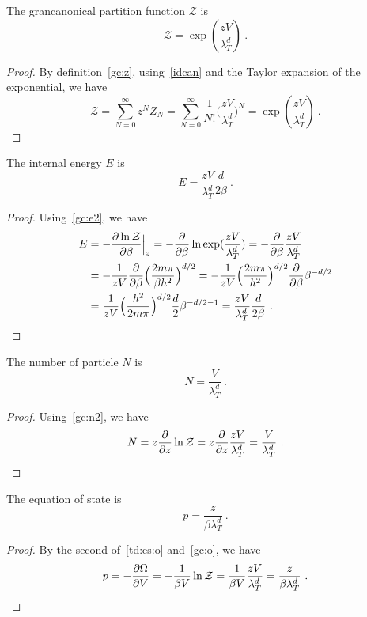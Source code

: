     The grancanonical partition function $\mathcal Z$ is 
    \begin{equation*}
        \mathcal Z = \exp(\frac{z V}{\lambda_T^d}) ~.
    \end{equation*}
    \begin{proof}
        By definition~\eqref{gc:z}, using~\eqref{idcan} and the Taylor expansion of the exponential, we have
        \begin{equation*}
            \mathcal Z = \sum_{N=0}^\infty z^N Z_N = \sum_{N=0}^\infty \frac{1}{N!} \Big ( \frac{z V}{\lambda_T^d} \Big)^N = \exp(\frac{z V}{\lambda_T^d}) ~.
        \end{equation*}
    \end{proof}
    The internal energy $E$ is 
    \begin{equation*}
        E = \frac{z V}{\lambda^d_T} \frac{d}{2 \beta} ~.
    \end{equation*}
    \begin{proof}
        Using~\eqref{gc:e2}, we have
        \begin{equation*}
        \begin{aligned}
            E & = - \frac{\partial\ln \mathcal Z}{\partial\beta} \Big \vert_z = - \frac{\partial}{\partial\beta} \ln \exp(\frac{z V}{\lambda_T^d}) = - \frac{\partial}{\partial\beta} \frac{z V}{\lambda^d_T} \\ & = - \frac{1}{zV} \frac{\partial}{\partial\beta} \Big ( \frac{2 m \pi} {\beta h^2} \Big )^{d/2} = - \frac{1}{z V} \Big ( \frac{2 m \pi}{h^2} \Big )^{d/2} \frac{\partial}{\partial\beta} \beta^{-d/2} \\ & = \frac{1}{zV} \Big ( \frac{h^2}{2 m \pi} \Big )^{d/2} \frac{d}{2} \beta^{-d/2 - 1} = \frac{z V}{\lambda^d_T} \frac{d}{2 \beta} ~.
        \end{aligned}
        \end{equation*}
    \end{proof}
    The number of particle $N$ is 
    \begin{equation*}
        N = \frac{V}{\lambda_T^d} ~.
    \end{equation*}
    \begin{proof}
        Using~\eqref{gc:n2}, we have
        \begin{equation*}
            N = z \frac{\partial}{\partial z} \ln \mathcal Z = z \frac{\partial}{\partial z} \frac{z V}{\lambda_T^d} = \frac{V}{\lambda_T^d} ~.
        \end{equation*}
    \end{proof}
    The equation of state is 
    \begin{equation*}
        p = \frac{z}{\beta \lambda_T^d} ~.
    \end{equation*}
    \begin{proof}
        By the second of~\eqref{td:es:o} and~\eqref{gc:o}, we have
        \begin{equation*}
            p = - \frac{\partial\Omega}{\partial V} = - \frac{1}{\beta V} \ln \mathcal Z = \frac{1}{\beta V} \frac{z V}{\lambda_T^d} = \frac{z}{\beta \lambda_T^d} ~.
        \end{equation*}
    \end{proof}

